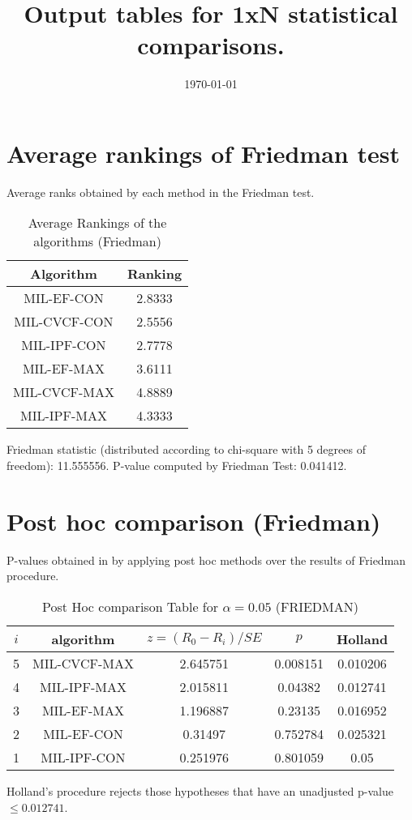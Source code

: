 \documentclass[a4paper,10pt]{article}
\title{Output tables for 1xN statistical comparisons.}
\author{}
\date{\today}
\begin{document}
\begin{landscape}
\pagestyle{empty}
\maketitle
\thispagestyle{empty}

\section{Average rankings of Friedman test}


Average ranks obtained by each method in the Friedman test.

\begin{table}[!htp]
\centering
\begin{tabular}{|c|c|}\hline
Algorithm&Ranking\\\hline
MIL-EF-CON&2.8333\\MIL-CVCF-CON&2.5556\\MIL-IPF-CON&2.7778\\MIL-EF-MAX&3.6111\\MIL-CVCF-MAX&4.8889\\MIL-IPF-MAX&4.3333\\\hline\end{tabular}
\caption{Average Rankings of the algorithms (Friedman)}
\end{table}

Friedman statistic (distributed according to chi-square with 5 degrees of freedom): 11.555556. \newline P-value computed by Friedman Test: 0.041412.\newline


\newpage

\section{Post hoc comparison (Friedman)}


P-values obtained in by applying post hoc methods over the results of Friedman procedure.

\begin{table}[!htp]
\centering\footnotesize
\begin{tabular}{ccccc}
$i$&algorithm&$z=(R_0 - R_i)/SE$&$p$&Holland\\
\hline5&MIL-CVCF-MAX&2.645751&0.008151&0.010206\\4&MIL-IPF-MAX&2.015811&0.04382&0.012741\\3&MIL-EF-MAX&1.196887&0.23135&0.016952\\2&MIL-EF-CON&0.31497&0.752784&0.025321\\1&MIL-IPF-CON&0.251976&0.801059&0.05\\\hline
\end{tabular}
\caption{Post Hoc comparison Table for $\alpha=0.05$ (FRIEDMAN)}
\end{table}Holland's procedure rejects those hypotheses that have an unadjusted p-value $\le0.012741$.



\end{landscape}
\end{document}

